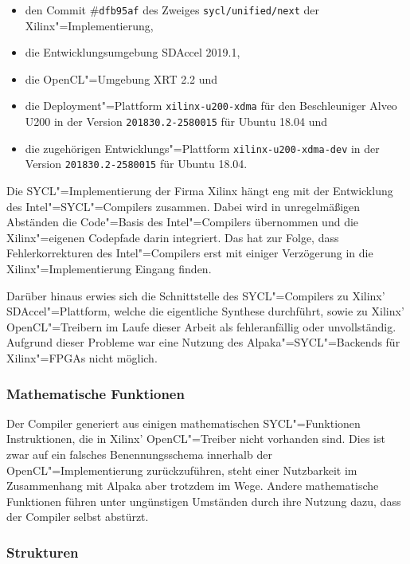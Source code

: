 \begin{itemize}
    \item den Commit \#\texttt{dfb95af} des Zweiges \texttt{sycl/unified/next}
          der Xilinx"=Implementierung,
    \item die Entwicklungsumgebung SDAccel 2019.1,
    \item die OpenCL"=Umgebung XRT 2.2 und
    \item die Deployment"=Plattform \texttt{xilinx-u200-xdma} für den
          Beschleuniger Alveo U200 in der Version \texttt{201830.2-2580015} für
          Ubuntu 18.04 und
    \item die zugehörigen Entwicklungs"=Plattform \texttt{xilinx-u200-xdma-dev}
          in der Version \texttt{201830.2-2580015} für Ubuntu 18.04.
\end{itemize}

Die SYCL"=Implementierung der Firma Xilinx hängt eng mit der Entwicklung des
Intel"=SYCL"=Compilers zusammen. Dabei wird in unregelmäßigen Abständen die
Code"=Basis des Intel"=Compilers übernommen und die Xilinx"=eigenen Codepfade
darin integriert. Das hat zur Folge, dass Fehlerkorrekturen des Intel"=Compilers
erst mit einiger Verzögerung in die Xilinx"=Implementierung Eingang finden.

Darüber hinaus erwies sich die Schnittstelle des SYCL"=Compilers zu Xilinx'
SDAccel"=Plattform, welche die eigentliche Synthese durchführt, sowie zu Xilinx'
OpenCL"=Treibern im Laufe dieser Arbeit als fehleranfällig oder unvollständig.
Aufgrund dieser Probleme war eine Nutzung des Alpaka"=SYCL"=Backends für
Xilinx"=FPGAs nicht möglich.

\subsubsection{Mathematische Funktionen}

Der Compiler generiert aus einigen mathematischen SYCL"=Funktionen
Instruktionen, die in Xilinx' OpenCL"=Treiber nicht vorhanden sind. Dies ist
zwar auf ein falsches Benennungsschema innerhalb der OpenCL"=Implementierung
zurückzuführen, steht einer Nutzbarkeit im Zusammenhang mit Alpaka aber trotzdem
im Wege. Andere mathematische Funktionen führen unter ungünstigen Umständen
durch ihre Nutzung dazu, dass der Compiler selbst abstürzt.  

\subsubsection{Strukturen}

